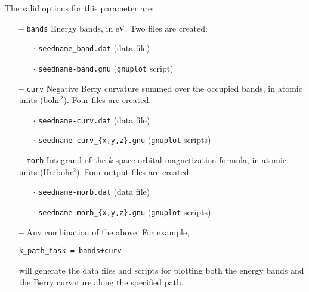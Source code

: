 The valid options for this parameter are:
\begin{itemize}

\item[{\bf --}] \verb#bands# Energy bands, in eV. Two files are
  created:
\begin{itemize}
  
   \item[$\cdot$] {\tt seedname\_band.dat} (data file)

   \item[$\cdot$] {\tt seedname-band.gnu} ({\tt gnuplot} script)

\end{itemize}

\item[{\bf --}] \verb#curv# Negative Berry curvature summed over the occupied
  bands, in atomic units (bohr$^2$). Four files are created:

\begin{itemize}

   \item[$\cdot$] {\tt seedname-curv.dat} (data file) 

   \item[$\cdot$] {\tt seedname-curv\_\{x,y,z\}.gnu} ({\tt gnuplot} scripts)

\end{itemize}

\item[{\bf --}] \verb#morb# Integrand of the $k$-space orbital
  magnetization formula, in atomic units (Ha$\cdot$bohr$^2$). Four output files are
  created:

\begin{itemize}

   \item[$\cdot$] {\tt seedname-morb.dat} (data file)

   \item[$\cdot$] {\tt seedname-morb\_\{x,y,z\}.gnu} ({\tt gnuplot}
     scripts).

\end{itemize}

\item[{\bf --}] Any combination of the above. For example,

{\tt k\_path\_task = bands+curv}

will generate the data files and scripts for plotting both the energy
bands and the Berry curvature along the specified path.


\end{itemize}

